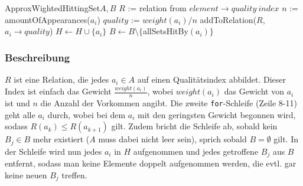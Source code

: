 \documentclass[a4paper]{article}
\begin{document}
	\maketitle
	\section{}
		\begin{pseudocode}{ApproxWightedHittingSet}{$A, B$}
			\State $R$ := relation from $element \rightarrow quality ~index$
				\State $n$ := amountOfAppearances($a_i$)
				\State $quality$ := $weight(a_i) / n$
				\State addToRelation($R$, $a_i\rightarrow quality$)
			\EndFor
				\State $H\gets H\cup \{a_i\}$
				\State $B\gets B\setminus\{$allSetsHitBy$(a_i)\}$
			\EndFor
		\end{pseudocode}
		\subsubsection*{Beschreibung}
		$R$ ist eine Relation, die jedes $a_i\in A$ auf einen Qualitätsindex abbildet.
		Dieser Index ist einfach das Gewicht $\frac{weight(a_i)}{n}$, wobei $weight(a_i)$ das Gewicht von $a_i$ ist und $n$ die Anzahl der Vorkommen angibt.\n
		Die zweite \texttt{for}-Schleife (Zeile 8-11) geht alle $a_i$ durch, wobei bei dem $a_i$ mit den geringsten Gewicht begonnen wird, sodass $R(a_k)\leq R(a_{k+1})$ gilt.
		Zudem bricht die Schleife ab, sobald kein $B_j\in B$ mehr existiert ($A$ muss dabei nicht leer sein), sprich sobald $B=\emptyset$ gilt.\n
		In der Schleife wird nun jedes $a_i$ in $H$ aufgenommen und jedes getroffene $B_j$ aus $B$ entfernt, sodass man keine Elemente doppelt aufgenommen werden, die evtl. gar keine neuen $B_j$ treffen.
	\section{}
\end{document}
